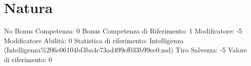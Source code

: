 \section{Natura}\label{natura}

\begin{description}
\tightlist
\item[Tags: ABI]
No Bonus Competenza: 0 Bonus Competenza di Riferimento: 1 Modificatore:
-5 Modificatore Abilità: 0 Statistica di riferimento: Intelligenza
(Intelligenza\%206c06104bf3ba4c73ad499ef033b99ee0.md) Tiro Salvezza: -5
Valore di riferimento: 0
\end{description}

